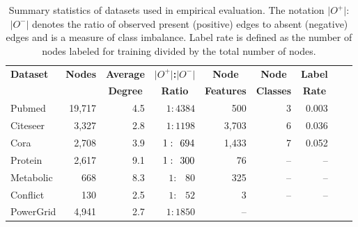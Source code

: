 \documentclass[letterpaper, conference]{IEEEtran}
\begin{document}
\begin{table}[ht]
\begin{center}
\caption[Caption for Table 1]{Summary statistics of datasets used in empirical evaluation. The notation $\vert\mathit{O}^+\vert$:$\vert\mathit{O}^-\vert$ denotes the ratio of observed present (positive) edges to absent (negative) edges and is a measure of class imbalance. Label rate is defined as the number of nodes labeled for training divided by the total number of nodes.}
\begin{adjustbox}{width=0.5\textwidth}
	\begin{tabular} {l  r  r  r  r  r  r  r  r}
	\hline
	\multicolumn{1}{l}{\multirow{2}{*}{\textbf{Dataset}}} &
	\multicolumn{1}{c}{\multirow{2}{*}{\textbf{Nodes}}} &
    \multicolumn{1}{c}{\multirow{1}{*}{\textbf{Average}}} &
	\multicolumn{1}{c}{\multirow{1}{*}{\textbf{$\vert\mathit{O}^+\vert$:$\vert\mathit{O}^-\vert$}}} &
	\multicolumn{1}{c}{\multirow{1}{*}{\textbf{Node}}} &
	\multicolumn{1}{c}{\multirow{1}{*}{\textbf{Node}}} &
	\multicolumn{1}{c}{\multirow{1}{*}{\textbf{Label}}} \\
    & {}
    & \multicolumn{1}{c}{\multirow{1}{*}{\textbf{Degree}}}
    & \multicolumn{1}{c}{\multirow{1}{*}{\textbf{Ratio}}}
    & \multicolumn{1}{c}{\multirow{1}{*}{\textbf{Features}}}
    & \multicolumn{1}{c}{\multirow{1}{*}{\textbf{Classes}}}
    & \multicolumn{1}{c}{\multirow{1}{*}{\textbf{Rate}}} \\
    \hline \hline
    Pubmed
				& 19,717
				& 4.5
                & $1:4384$
				& 500
				& 3
				& 0.003 \\
    Citeseer
				& 3,327 
				& 2.8
                & $1:1198$
				& 3,703
				& 6
				& 0.036 \\
	Cora	
				& 2,708
				& 3.9
                & $1: \hspace{4.5pt} 694$
				& 1,433
				& 7
				& 0.052 \\
	Protein
					& 2,617
					& 9.1
                    & $1: \hspace{4.5pt} 300$
					& 76
					& --
					& -- \\
	Metabolic
					& 668
					& 8.3
                    & $1: \hspace{9pt} 80$
					& 325
					& --
					& -- \\
	Conflict
					& 130
					& 2.5
                    & $1: \hspace{9pt} 52$
					& 3
					& --
					& -- \\
	PowerGrid
				 & 4,941
				 & 2.7
                 & $1:1850$
				 & --

\end{tabular}
\end{adjustbox}
\end{center}
\end{table}
\end{document}
